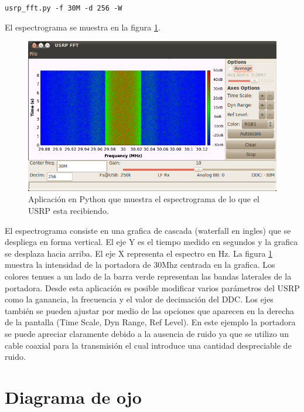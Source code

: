 \begin{center}
\verb|usrp_fft.py -f 30M -d 256 -W|
\end{center}

El espectrograma se muestra en la figura \ref{fig:spectrogramgui}.

\begin{figure}[htp]
  \centering
  \includegraphics[scale=0.7]{figs/spectrogramgui}
  \caption{Aplicaci\'on en Python que muestra el espectrograma de lo que el USRP esta recibiendo.}
  \label{fig:spectrogramgui}
\end{figure}

El espectrograma consiste en una grafica de cascada (waterfall en ingles) que se despliega en forma
vertical. El eje Y es el tiempo medido en segundos y la grafica se desplaza hacia arriba. El eje X
representa el espectro en Hz. La figura \ref{fig:spectrogramgui} muestra la intensidad de la
portadora de 30Mhz centrada en la grafica. Los colores tenues a un lado de la barra verde
representan las bandas laterales de la portadora. Desde esta aplicaci\'on es posible modificar
varios par\'ametros del USRP como la ganancia, la frecuencia y el valor de decimaci\'on del DDC.
Los ejes tambi\'en se pueden ajustar por medio de las opciones que aparecen en la derecha de la
pantalla (Time Scale, Dyn Range, Ref Level). En este ejemplo la portadora se puede apreciar
claramente debido a la ausencia de ruido ya que se utilizo un cable coaxial para la transmisi\'on el
cual introduce una cantidad despreciable de ruido.
\section{Diagrama de ojo}

